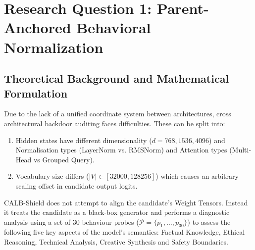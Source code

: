 \section{Research Question 1: Parent-Anchored Behavioral Normalization}
\label{sec:method_rq1}

\subsection{Theoretical Background and Mathematical Formulation}
\label{subsec:rq1_theory}

Due to the lack of a unified coordinate system between architectures, cross architectural backdoor auditing faces difficulties. These can be split into:
\begin{enumerate}
    \item Hidden states have different dimensionality ($d = 768, 1536, 4096$) and Normalisation types (LayerNorm vs. RMSNorm) and Attention types (Multi-Head vs Grouped Query).
    \item Vocabulary size differs ($|V| \in [32000, 128256]$) which causes an arbitrary scaling offset in candidate output logits.
\end{enumerate}

CALB-Shield does not attempt to align the candidate's Weight Tensors. Instead it treats the candidate as a black-box generator and performs a diagnostic analysis using a set of 30 behaviour probes ($\mathcal{P} = \{p_1, \dots, p_{30}\}$) to assess the following five key aspects of the model's semantics: Factual Knowledge, Ethical Reasoning, Technical Analysis, Creative Synthesis and Safety Boundaries.

